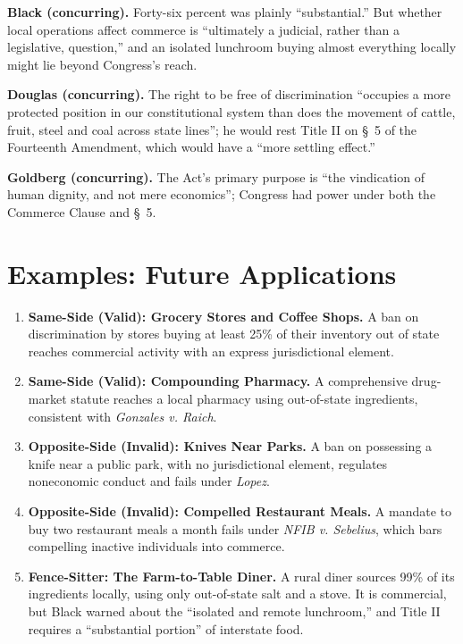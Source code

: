 \documentclass[12pt]{article}
\begin{document}
\textbf{Black (concurring).} Forty-six percent was plainly ``substantial.'' But whether local operations affect commerce is ``ultimately a judicial, rather than a legislative, question,'' and an isolated lunchroom buying almost everything locally might lie beyond Congress's reach.

\textbf{Douglas (concurring).} The right to be free of discrimination ``occupies a more protected position in our constitutional system than does the movement of cattle, fruit, steel and coal across state lines''; he would rest Title II on \S~5 of the Fourteenth Amendment, which would have a ``more settling effect.''

\textbf{Goldberg (concurring).} The Act's primary purpose is ``the vindication of human dignity, and not mere economics''; Congress had power under both the Commerce Clause and \S~5.

\section{Examples: Future Applications}

\begin{enumerate}
\item \textbf{Same-Side (Valid): Grocery Stores and Coffee Shops.} A ban on discrimination by stores buying at least 25\% of their inventory out of state reaches commercial activity with an express jurisdictional element.
\item \textbf{Same-Side (Valid): Compounding Pharmacy.} A comprehensive drug-market statute reaches a local pharmacy using out-of-state ingredients, consistent with \textit{Gonzales v. Raich}.
\item \textbf{Opposite-Side (Invalid): Knives Near Parks.} A ban on possessing a knife near a public park, with no jurisdictional element, regulates noneconomic conduct and fails under \textit{Lopez}.
\item \textbf{Opposite-Side (Invalid): Compelled Restaurant Meals.} A mandate to buy two restaurant meals a month fails under \textit{NFIB v. Sebelius}, which bars compelling inactive individuals into commerce.
\item \textbf{Fence-Sitter: The Farm-to-Table Diner.} A rural diner sources 99\% of its ingredients locally, using only out-of-state salt and a stove. It is commercial, but Black warned about the ``isolated and remote lunchroom,'' and Title II requires a ``substantial portion'' of interstate food.
\end{enumerate}
\end{document}
